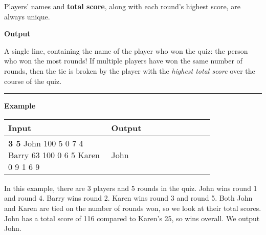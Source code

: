 Players' names and \textbf{total score}, along with each round's highest score, are always unique.

\textbf{Output}

A single line, containing the name of the player who won the quiz:
the person who won the most rounds!
If multiple players have won the same number of rounds, 
then the tie is broken by the player with the \textit{highest total score} over the course of the quiz.

\vspace{8pt}
\hrule

\textbf{Example}

\begin{table}[h]
    \centering
    \begin{tabular}{|p{0.4\linewidth}|p{0.4\linewidth}|}
        \hline
        Input & Output \\
        \hline
        \textbf{3 5} \newline John 100 5 0 7 4 \newline Barry 63 100 0 6 5 \newline Karen 0 9 1 6 9 & 
        John \\
        \hline
    \end{tabular}
\end{table}

In this example, there are 3 players and 5 rounds in the quiz.
John wins round 1 and round 4. Barry wins round 2. Karen wins round 3 and round 5.
Both John and Karen are tied on the number of rounds won, so we look at their total scores.
John has a total score of 116 compared to Karen's 25, so wins overall. We output John.